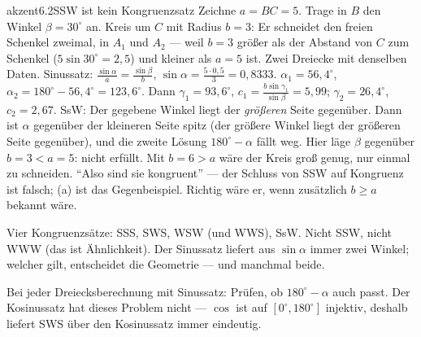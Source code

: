 \begin{loesungkarte}{akzent}{6.2}{SSW ist kein Kongruenzsatz}
Zeichne $a = BC = 5$. Trage in $B$ den Winkel $\beta = 30^{\circ}$ an. Kreis um $C$ mit Radius $b = 3$: Er schneidet den freien Schenkel zweimal, in $A_1$ und $A_2$ --- weil $b = 3$ größer als der Abstand von $C$ zum Schenkel ($5\sin30^{\circ} = 2{,}5$) und kleiner als $a = 5$ ist. Zwei Dreiecke mit denselben Daten.
Sinussatz: $\frac{\sin\alpha}a = \frac{\sin\beta}b$, $\sin\alpha = \frac{5\cdot0{,}5}3 = 0{,}8333$. $\alpha_1 = 56{,}4^{\circ}$, $\alpha_2 = 180^{\circ} - 56{,}4^{\circ} = 123{,}6^{\circ}$. Dann $\gamma_1 = 93{,}6^{\circ}$, $c_1 = \frac{b\sin\gamma_1}{\sin\beta} = 5{,}99$; $\gamma_2 = 26{,}4^{\circ}$, $c_2 = 2{,}67$.
SsW: Der gegebene Winkel liegt der \emph{größeren} Seite gegenüber. Dann ist $\alpha$ gegenüber der kleineren Seite spitz (der größere Winkel liegt der größeren Seite gegenüber), und die zweite Lösung $180^{\circ} - \alpha$ fällt weg. Hier läge $\beta$ gegenüber $b = 3 < a = 5$: nicht erfüllt. Mit $b = 6 > a$ wäre der Kreis groß genug, nur einmal zu schneiden.
\enquote{Also sind sie kongruent} --- der Schluss von SSW auf Kongruenz ist falsch; (a) ist das Gegenbeispiel. Richtig wäre er, wenn zusätzlich $b\ge a$ bekannt wäre.
\begin{fehler}\kastentext
Vier Kongruenzsätze: SSS, SWS, WSW (und WWS), SsW. Nicht SSW, nicht WWW (das ist Ähnlichkeit). Der Sinussatz liefert aus $\sin\alpha$ immer zwei Winkel; welcher gilt, entscheidet die Geometrie --- und manchmal beide.
\end{fehler}
\begin{mitnehmen}\kastentext
Bei jeder Dreiecksberechnung mit Sinussatz: Prüfen, ob $180^{\circ} - \alpha$ auch passt. Der Kosinussatz hat dieses Problem nicht --- $\cos$ ist auf $[0^{\circ}, 180^{\circ}]$ injektiv, deshalb liefert SWS über den Kosinussatz immer eindeutig.
\end{mitnehmen}
\end{loesungkarte}

